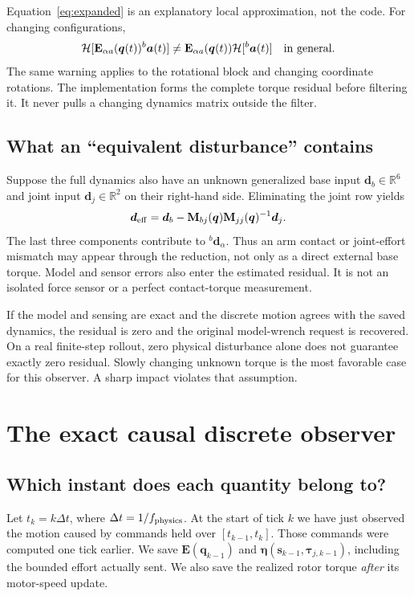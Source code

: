 \documentclass[11pt,a4paper]{article}
\newcommand{\vct}[1]{\boldsymbol{#1}}
\newcommand{\mat}[1]{\mathbf{#1}}
\newcommand{\bv}[1]{{}^{b}\vct{#1}}
\newcommand{\RR}{\mathbb R}
\begin{document}
Equation~\eqref{eq:expanded} is an explanatory local approximation, not the code.
For changing configurations,
\begin{equation}
\mathcal H[\mat E_{\alpha a}(\vct q(t))\bv a(t)]
\ne\mat E_{\alpha a}(\vct q(t))\mathcal H[\bv a(t)]
\quad\hbox{in general}.
\label{eq:noncommute}
\end{equation}
The same warning applies to the rotational block and changing coordinate
rotations. The implementation forms the complete torque residual before
filtering it. It never pulls a changing dynamics matrix outside the filter.

\subsection{What an ``equivalent disturbance'' contains}
Suppose the full dynamics also have an unknown generalized base input
$\vct d_b\in\RR^6$ and joint input $\vct d_j\in\RR^2$ on their right-hand side.
Eliminating the joint row yields
\begin{equation}
\vct d_{\rm eff}=\vct d_b-
\mat M_{bj}(\vct q)\mat M_{jj}(\vct q)^{-1}\vct d_j.
\label{eq:effectiveexternal}
\end{equation}
The last three components contribute to $\bv d_\alpha$. Thus an arm contact or
joint-effort mismatch may appear through the reduction, not only as a direct
external base torque. Model and sensor errors also enter the estimated residual.
It is not an isolated force sensor or a perfect contact-torque measurement.

If the model and sensing are exact and the discrete motion agrees with the
saved dynamics, the residual is zero and the original model-wrench request is
recovered. On a real finite-step rollout, zero physical disturbance alone does
not guarantee exactly zero residual. Slowly changing unknown torque is the
most favorable case for this observer. A sharp impact violates that assumption.

\section{The exact causal discrete observer}\label{sec:discrete}

\subsection{Which instant does each quantity belong to?}
Let $t_k=k\Delta t$, where $\Delta t=1/f_{\rm physics}$. At the start of tick $k$
we have just observed the motion caused by commands held over
$[t_{k-1},t_k]$. Those commands were computed one tick earlier.
We save $\mat E(\vct q_{k-1})$ and
$\vct\eta(\vct s_{k-1},\vct\tau_{j,k-1})$, including the bounded effort actually
sent. We also save the realized rotor torque \emph{after} its motor-speed update.
\end{document}
